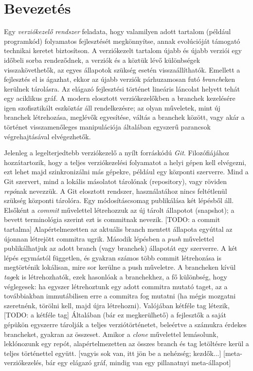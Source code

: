 \documentclass[final]{elteikthesis}[2025/03/25]
\begin{document}
\tableofcontents
\cleardoublepage

\chapter{Bevezetés}

Egy \textit{verziókezelő rendszer} feladata, hogy valamilyen adott tartalom (például programkód)
folyamatos fejlesztését megkönnyítse, annak evolúcióját támogató technikai keretet biztosítson.
A verziókezelt tartalom újabb és újabb verziói egy időbeli sorba rendeződnek,
a verziók és a köztük lévő különbségek visszakövethetők,
az egyes állapotok szükség esetén visszaállíthatók.
Emellett a fejlesztés el is ágazhat,
ekkor az újabb verziók párhuzamosan futó \textit{branch}eken kerülnek tárolásra.
Az elágazó fejlesztési történet lineáris láncolat helyett tehát egy aciklikus gráf. 
A modern elosztott verziókezelőkben a branchek kezelésére igen szofisztikált eszköztár áll rendelkezésre;
az olyan műveletek, mint új branchek létrehozása, meglévők egyesítése,
váltás a branchek között,
vagy akár a történet visszamenőleges manipulációja
általában egyszerű parancsok végrehajtásával elvégezhetők.

Jelenleg a legelterjedtebb verziókezelő a nyílt forráskódú \textit{Git}.
Filozófiájához hozzátartozik,
hogy a teljes verziókezelési folyamatot a helyi gépen kell elvégezni,
ezt lehet majd szinkronizálni más gépekre, például egy központi szerverre.
Mind a Git szervert, mind a lokális másolatot tárolónak (repository),
vagy röviden \textit{repó}nak nevezzük.
A Git elosztott rendszer,
használatához nincs feltétlenül szükség központi tárolóra.
Egy módosításcsomag publikálása két lépésből áll.
Elsőként a \textit{commit} művelettel létrehozzuk az új tárolt állapotot (snapshot);
a bevett terminológia szerint ezt is commitnak nevezik.
[TODO: a commit tartalma]
Alapértelmezetten az aktuális branch mentett állapota egyúttal az újonnan létrejött commitra ugrik.
Második lépésben a \textit{push} művelettel publikálhatjuk az adott branch (vagy branchek) állapotát egy szerverre.
A két lépés egymástól független,
és gyakran számos több commit létrehozása is megtörténik lokálisan,
mire sor kerülne a push műveletre.
A brancheken kívül \textit{tag}ek is létrehozhatók,
ezek hasonlóak a branchekhez,
a fő különbség, hogy véglegesek:
ha egyszer létrehoztunk egy adott commitra mutató taget,
az a továbbiakban immutábilisen erre a commitra fog mutatni
(ha mégis mozgatni szeretnénk, törölni kell, majd újra létrehozni).
Valójában kétféle tag létezik,
[TODO: a kétféle tag]
Általában (bár ez megkerülhető) a fejlesztők a saját gépükön
egyszerre tárolják a teljes verziótörténetet,
beleértve a számukra érdekes brancheket, gyakran az összeset.
Amikor a \textit{clone} művelettel lemásolunk, leklónozunk egy repót,
alapértelmezetten az összes branch és tag letöltésre kerül a teljes történettel együtt.
[vagyis sok van, itt jön be a nehézség; kezdők...]
[meta-verziókezelés, bár egy elágazó gráf, mindig van egy pillanatnyi meta-állapot]
\end{document}
